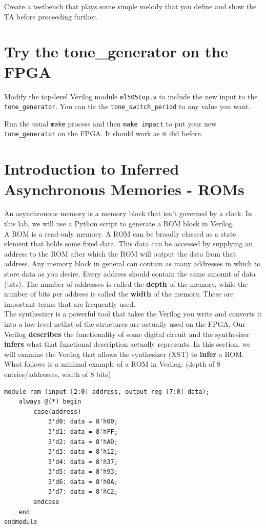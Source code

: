 \documentclass[11pt]{article}
\begin{document}
Create a testbench that plays some simple melody that you define and show the TA before proceeding further.

\section{Try the tone\_generator on the FPGA}
Modify the top-level Verilog module \verb|ml505top.v| to include the new input to the \verb|tone_generator|. You can tie the \verb|tone_switch_period| to any value you want.

Run the usual \verb|make| process and then \verb|make impact| to put your new \verb|tone_generator| on the FPGA. It should work as it did before.

\section{Introduction to Inferred Asynchronous Memories - ROMs}
An asynchronous memory is a memory block that isn't governed by a clock. In this lab, we will use a Python script to generate a ROM block in Verilog.\\

A ROM is a read-only memory. A ROM can be broadly classed as a state element that holds some fixed data. This data can be accessed by supplying an address to the ROM after which the ROM will output the data from that address. Any memory block in general can contain as many addresses in which to store data as you desire. Every address should contain the same amount of data (bits). The number of addresses is called the \textbf{depth} of the memory, while the number of bits per address is called the \textbf{width} of the memory. These are important terms that are frequently used. \\

The synthesizer is a powerful tool that takes the Verilog you write and converts it into a low-level netlist of the structures are actually used on the FPGA. Our Verilog \textbf{describes} the functionality of some digital circuit and the synthesizer \textbf{infers} what that functional description actually represents. In this section, we will examine the Verilog that allows the synthesizer (XST) to \textbf{infer} a ROM. What follows is a minimal example of a ROM in Verilog: (depth of 8 entries/addresses, width of 8 bits)

\begin{verbatim}
module rom (input [2:0] address, output reg [7:0] data);
	always @(*) begin
		case(address)
			3'd0: data = 8'h00;
			3'd1: data = 8'hFF;
			3'd2: data = 8'hAD;
			3'd3: data = 8'h12;
			3'd4: data = 8'h37;
			3'd5: data = 8'h93;
			3'd6: data = 8'h0A;
			3'd7: data = 8'hC2;
		endcase
	end
endmodule
\end{verbatim}
\end{document}
